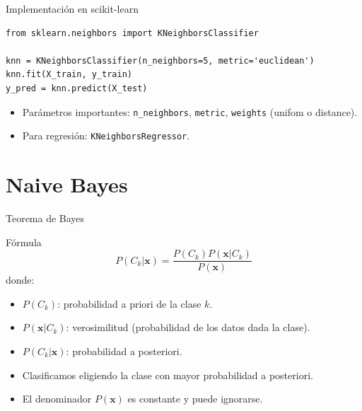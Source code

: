 \documentclass[aspectratio=169, 10pt, xcolor=table]{beamer}
\begin{document}
\begin{frame}[fragile]{Implementación en scikit-learn}
    \begin{lstlisting}
from sklearn.neighbors import KNeighborsClassifier

knn = KNeighborsClassifier(n_neighbors=5, metric='euclidean')
knn.fit(X_train, y_train)
y_pred = knn.predict(X_test)
    \end{lstlisting}
    \begin{itemize}
        \item Parámetros importantes: \texttt{n\_neighbors}, \texttt{metric}, \texttt{weights} (unifom o distance).
        \item Para regresión: \texttt{KNeighborsRegressor}.
    \end{itemize}
\end{frame}

\section{Naive Bayes}

\begin{frame}{Teorema de Bayes}
    \begin{block}{Fórmula}
        \[
        P(C_k|\mathbf{x}) = \frac{P(C_k) P(\mathbf{x}|C_k)}{P(\mathbf{x})}
        \]
        donde:
        \begin{itemize}
            \item $P(C_k)$: probabilidad a priori de la clase $k$.
            \item $P(\mathbf{x}|C_k)$: verosimilitud (probabilidad de los datos dada la clase).
            \item $P(C_k|\mathbf{x})$: probabilidad a posteriori.
        \end{itemize}
    \end{block}
    \begin{itemize}
        \item Clasificamos eligiendo la clase con mayor probabilidad a posteriori.
        \item El denominador $P(\mathbf{x})$ es constante y puede ignorarse.
    \end{itemize}
\end{frame}
\end{document}
